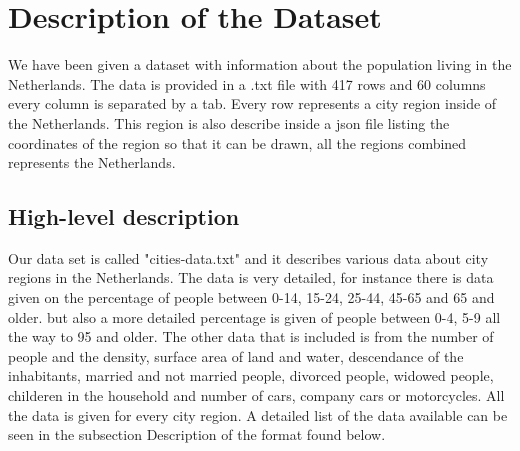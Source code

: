 \documentclass[a4paper,twoside,11pt]{article}
\begin{document}
\section{Description of the Dataset}
We have been given a dataset with information about the population living in the Netherlands. The data is provided in a .txt file with 417 rows and 60 columns every column is separated by a tab. Every row represents a city region inside of the Netherlands. This region is also describe inside a json file listing the coordinates of the region so that it can be drawn, all the regions combined represents the Netherlands.
\subsection{High-level description}
Our data set is called "cities-data.txt" and it describes various data about city regions in the Netherlands. The data is very detailed, for instance there is data given on the percentage of people between 0-14, 15-24, 25-44, 45-65 and 65 and older. but also a more detailed percentage is given of people between 0-4, 5-9 all the way to 95 and older. \newline
The other data that is included is from the number of people and the density, surface area of land and water, descendance of the inhabitants, married and not married people, divorced people, widowed people, childeren in the household and number of cars, company cars or motorcycles. All the data is given for every city region. A detailed list of the data available can be seen in the subsection Description of the format found below. \newline
\end{document}
